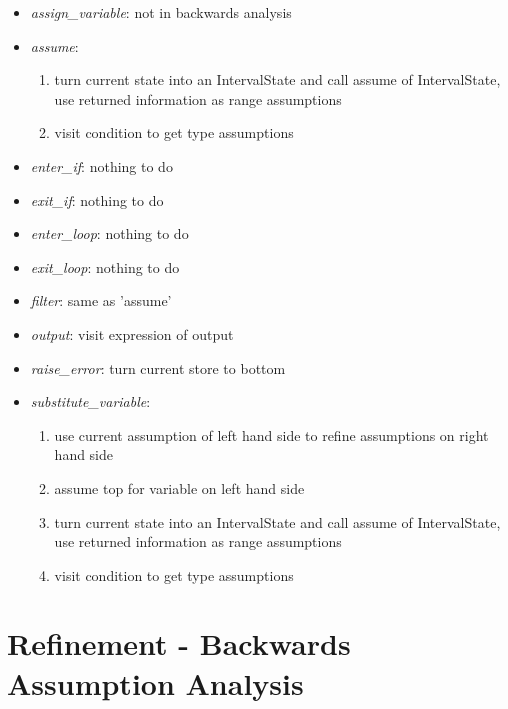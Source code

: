 \documentclass[11pt]{article}
\begin{document}
\begin{itemize}
\item \textit{assign\_variable}: not in backwards analysis
\item \textit{assume}:
\begin{enumerate}
\item turn current state into an IntervalState and call assume of IntervalState, use returned information as range assumptions
\item visit condition to get type assumptions
\end{enumerate} 
\item \textit{enter\_if}: nothing to do
\item \textit{exit\_if}: nothing to do
\item \textit{enter\_loop}: nothing to do
\item \textit{exit\_loop}: nothing to do
\item \textit{filter}: same as 'assume'
\item \textit{output}: visit expression of output
\item \textit{raise\_error}: turn current store to bottom
\item \textit{substitute\_variable}:
\begin{enumerate}
\item use current assumption of left hand side to refine assumptions on right hand side
\item assume top for variable on left hand side
\item turn current state into an IntervalState and call assume of IntervalState, use returned information as range assumptions
\item visit condition to get type assumptions
\end{enumerate}
\end{itemize}


\section{Refinement - Backwards Assumption Analysis}
\end{document}
